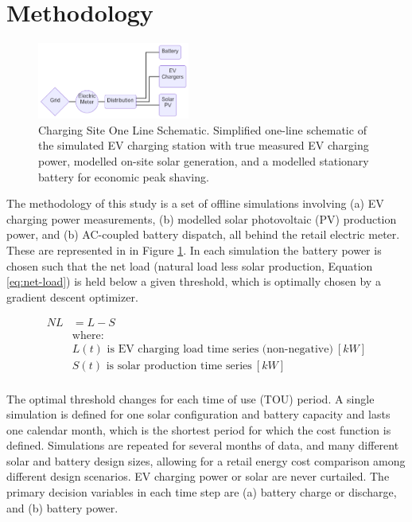 \documentclass[
]{article}
\begin{document}
\hypertarget{methodology}{%
  \section{Methodology}\label{methodology}}

\begin{figure}
  \centering
  \includegraphics[width=5cm,height=\textheight]{./images/oneline.png}
  \caption{Charging Site One Line Schematic. Simplified
  one-line schematic of the simulated EV charging station with true
  measured EV charging power, modelled on-site solar generation, and a
  modelled stationary battery for economic peak shaving.}
  \label{fig:oneline}
\end{figure}

The methodology of this study is a set of offline simulations involving
(a) EV charging power measurements, (b) modelled solar photovoltaic (PV)
production power, and (b) AC-coupled battery dispatch, all behind the
retail electric meter. These are represented in in Figure \ref{fig:oneline}.
In each simulation the battery power is chosen
such that the net load (natural load less solar production, Equation \ref{eq:net-load}) is held
below a given threshold, which is optimally chosen by a gradient descent
optimizer.

\begin{equation}
  \label{eq:net-load}
  \begin{split}
    NL &= L - S \\
    &\text{where:} \\
    &L(t) \text{ is EV charging load time series (non-negative)}\ [kW]\\
    &S(t) \text{ is solar production time series}\ [kW] \\
  \end{split}
\end{equation}

The optimal threshold changes for each time of use (TOU)
period. A single simulation is defined for one solar configuration and
battery capacity and lasts one calendar month, which is the shortest
period for which the cost function is defined. Simulations are repeated
for several months of data, and many different solar and battery design
sizes, allowing for a retail energy cost comparison among different
design scenarios. EV charging power or solar are never curtailed. The
primary decision variables in each time step are (a) battery charge or
discharge, and (b) battery power.
\end{document}
